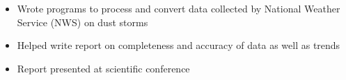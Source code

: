 {
	\begin{itemize}
		\item Wrote programs to process and convert data collected by National Weather Service (NWS) on dust storms
		\item Helped write report on completeness and accuracy of data as well as trends
		\item Report presented at scientific conference				
	\end{itemize}
}
